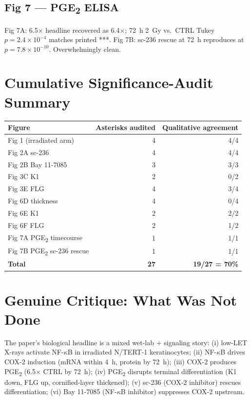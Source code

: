\documentclass[11pt]{article}
\begin{document}
\subsection{Fig 7 --- PGE\textsubscript{2} ELISA}
Fig 7A: 6.5$\times$ headline recovered as 6.4$\times$; 72~h 2~Gy vs.\ CTRL Tukey $p = 2.4\!\times\!10^{-4}$ matches printed ***. Fig 7B: sc-236 rescue at 72~h reproduces at $p = 7.8\!\times\!10^{-10}$. Overwhelmingly clean.

\section{Cumulative Significance-Audit Summary}

\begin{center}
\begin{tabular}{lrr}
\toprule
Figure & Asterisks audited & Qualitative agreement \\
\midrule
Fig 1 (irradiated arm) & 4 & 4/4 \\
Fig 2A sc-236 & 4 & 4/4 \\
Fig 2B Bay 11-7085 & 3 & 3/3 \\
Fig 3C K1 & 2 & 0/2 \\
Fig 3E FLG & 4 & 3/4 \\
Fig 6D thickness & 4 & 0/4 \\
Fig 6E K1 & 2 & 2/2 \\
Fig 6F FLG & 2 & 1/2 \\
Fig 7A PGE\textsubscript{2} timecourse & 1 & 1/1 \\
Fig 7B PGE\textsubscript{2} sc-236 rescue & 1 & 1/1 \\
\midrule
\textbf{Total} & \textbf{27} & \textbf{19/27 = 70\%} \\
\bottomrule
\end{tabular}
\end{center}

\section{Genuine Critique: What Was Not Done}

The paper's biological headline is a mixed wet-lab + signaling story: (i) low-LET X-rays activate NF-$\kappa$B in irradiated N/TERT-1 keratinocytes; (ii) NF-$\kappa$B drives COX-2 induction (mRNA within 4~h, protein by 72~h); (iii) COX-2 produces PGE\textsubscript{2} (6.5$\times$ CTRL by 72~h); (iv) PGE\textsubscript{2} disrupts terminal differentiation (K1 down, FLG up, cornified-layer thickened); (v) sc-236 (COX-2 inhibitor) rescues differentiation; (vi) Bay 11-7085 (NF-$\kappa$B inhibitor) suppresses COX-2 upstream.
\end{document}
